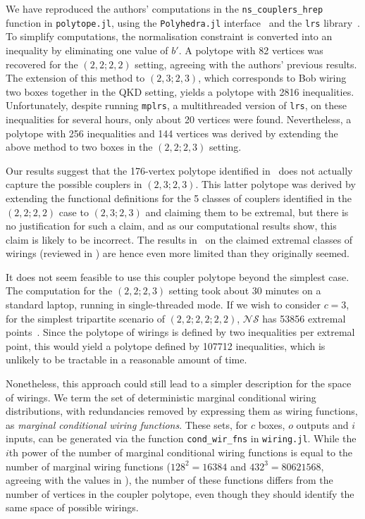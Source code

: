 \documentclass[10pt, a4paper]{article}
\numberwithin{equation}{section} %
\theoremstyle{definition}
\theoremstyle{plain}
\newcommand{\?}{\mathrel{?}} %
\newcommand{\NSs}{\mathcal{NS}}
\begin{document}
                  We have reproduced the authors' computations in the \verb`ns_couplers_hrep` function in \verb`polytope.jl`, using the \verb`Polyhedra.jl` interface~\cite{Polyhedra} and the \verb`lrs` library~\cite{LRS}. To simplify computations, the normalisation constraint is converted into an inequality by eliminating one value of \(b'\). A polytope with 82 vertices was recovered for the \((2,2;2,2)\) setting, agreeing with the authors' previous results. The extension of this method to \((2,3;2,3)\), which corresponds to Bob wiring two boxes together in the QKD setting, yields a polytope with 2816 inequalities. Unfortunately, despite running \verb`mplrs`, a multithreaded version of \verb`lrs`, on these inequalities for several hours, only about 20 vertices were found. Nevertheless, a polytope with 256 inequalities and 144 vertices was derived by extending the above method to two boxes in the \((2,2;2,3)\) setting.

                  Our results suggest that the 176-vertex polytope identified in~\cite[Sec. 7.1]{JanLiThesis} does not actually capture the possible couplers in \((2,3;2,3)\). This latter polytope was derived by extending the functional definitions for the 5 classes of couplers identified in the \((2,2;2,2)\) case to \((2,3;2,3)\) and claiming them to be extremal, but there is no justification for such a claim, and as our computational results show, this claim is likely to be incorrect. The results in~\cite{JanLiThesis} on the claimed extremal classes of wirings (reviewed in ) are hence even more limited than they originally seemed.

                  It does not seem feasible to use this coupler polytope beyond the simplest case. The computation for the \((2,2;2,3)\) setting took about 30 minutes on a standard laptop, running in single-threaded mode. If we wish to consider \(c=3\), for the simplest tripartite scenario of \((2,2; 2,2; 2,2)\), \(\NSs\) has 53856 extremal points~\cite{Tripartite}. Since the polytope of wirings is defined by two inequalities per extremal point, this would yield a polytope defined by 107712 inequalities, which is unlikely to be tractable in a reasonable amount of time.


                  Nonetheless, this approach could still lead to a simpler description for the space of wirings. We term the set of deterministic marginal conditional wiring distributions, with redundancies removed by expressing them as wiring functions, as \emph{marginal conditional wiring functions}. These sets, for \(c\) boxes, \(o\) outputs and \(i\) inputs, can be generated via the function \verb`cond_wir_fns` in \verb`wiring.jl`. While the \(i\)th power of the number of marginal conditional wiring functions is equal to the number of marginal wiring functions (\(128^2 = 16384\) and \(432^3 = 80621568\), agreeing with the values in ), the number of these functions differs from the number of vertices in the coupler polytope, even though they should identify the same space of possible wirings.
\end{document}
